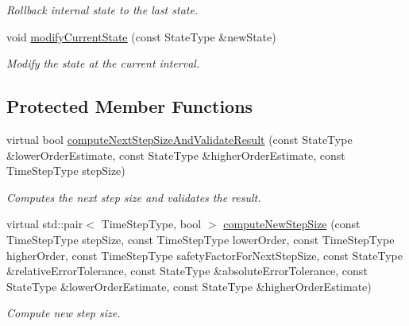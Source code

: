 \begin{DoxyCompactItemize}
\begin{DoxyCompactList}\small\item\em Rollback internal state to the last state. \end{DoxyCompactList}\item 
void \hyperlink{classtudat_1_1numerical__integrators_1_1RungeKuttaVariableStepSizeIntegrator_a2154eb8c731b4332dd70dc10e11711b3}{modify\+Current\+State} (const State\+Type \&new\+State)
\begin{DoxyCompactList}\small\item\em Modify the state at the current interval. \end{DoxyCompactList}\end{DoxyCompactItemize}
\subsection*{Protected Member Functions}
\begin{DoxyCompactItemize}
\item 
virtual bool \hyperlink{classtudat_1_1numerical__integrators_1_1RungeKuttaVariableStepSizeIntegrator_a2074aa4b30e623e505c990f12161a388}{compute\+Next\+Step\+Size\+And\+Validate\+Result} (const State\+Type \&lower\+Order\+Estimate, const State\+Type \&higher\+Order\+Estimate, const Time\+Step\+Type step\+Size)
\begin{DoxyCompactList}\small\item\em Computes the next step size and validates the result. \end{DoxyCompactList}\item 
virtual std\+::pair$<$ Time\+Step\+Type, bool $>$ \hyperlink{classtudat_1_1numerical__integrators_1_1RungeKuttaVariableStepSizeIntegrator_a25e44c7e640f91b4805759757a9dcab9}{compute\+New\+Step\+Size} (const Time\+Step\+Type step\+Size, const Time\+Step\+Type lower\+Order, const Time\+Step\+Type higher\+Order, const Time\+Step\+Type safety\+Factor\+For\+Next\+Step\+Size, const State\+Type \&relative\+Error\+Tolerance, const State\+Type \&absolute\+Error\+Tolerance, const State\+Type \&lower\+Order\+Estimate, const State\+Type \&higher\+Order\+Estimate)
\begin{DoxyCompactList}\small\item\em Compute new step size. \end{DoxyCompactList}\end{DoxyCompactItemize}

